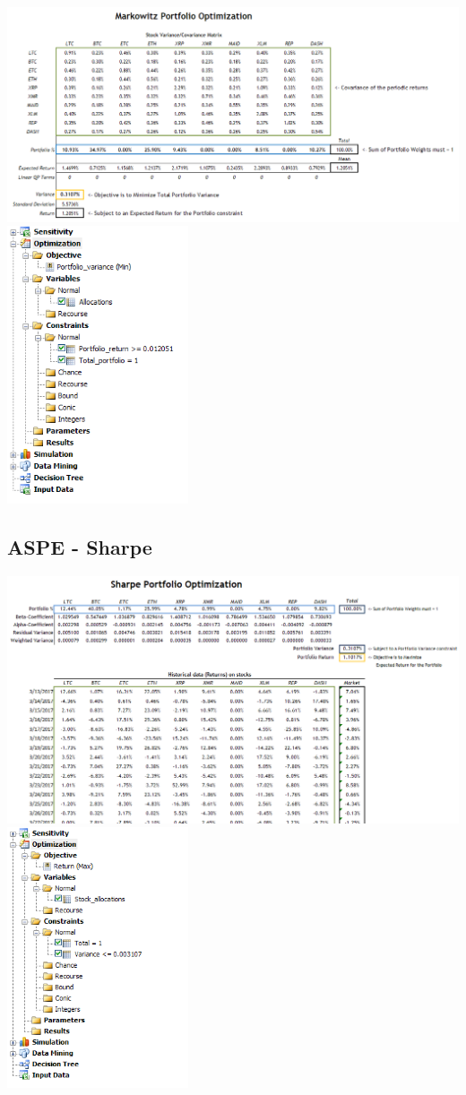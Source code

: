 \documentclass[11pt]{article} %
\begin{document}
\includegraphics[width=\textwidth]{aspe1}
\includegraphics[width=0.4\textwidth]{aspe2}

\subsection*{ASPE - Sharpe}
\includegraphics[width=\textwidth]{aspe3}
\includegraphics[width=0.4\textwidth]{aspe4}
\end{document}

